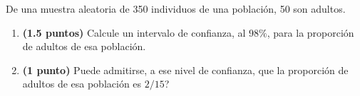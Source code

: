 
De una muestra aleatoria de 350 individuos de una población, 50 son adultos.
\begin{enumerate}[label=\alph*)]
\item \textbf{(1.5 puntos)} Calcule un intervalo de confianza, al $98\%$, para la proporción de adultos de esa población.
\item \textbf{(1 punto)} \textquestiondown{}Puede admitirse, a ese nivel de confianza, que la proporción de adultos de esa población es $2/15$?
\end{enumerate}
